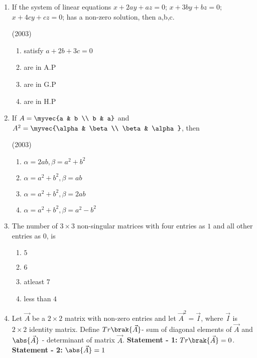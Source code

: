 	\begin{enumerate}
\item
	If the system of linear equations $x+2ay+az = 0$; $x+3by+bz = 0$; $x+4cy+cz = 0$; has a non-zero solution, then a,b,c.

	\hfill (2003)

	\begin{enumerate}
                \item satisfy $a+ 2b+3c = 0$
                \item are in A.P
                \item are in G.P
                \item are in H.P
        \end{enumerate} 	


\item
        If $A=\myvec{a & b \\ b & a}$ and $A^{2}=\myvec{\alpha & \beta \\ \beta & \alpha}$, then 
        
	\hfill (2003)
                                             
        \begin{enumerate}
		\item $\alpha=2ab, \beta=a^{2}+b^{2}$
                \item $\alpha=a^{2}+b^{2}, \beta=ab$
                \item $\alpha=a^{2}+b^{2}, \beta=2ab$
                \item $\alpha=a^{2}+b^{2}, \beta=a^{2}-b^{2}$
        \end{enumerate}

\newcommand{\adj}[1]{$adj\brak{#1}$}
%
    \item The number of $3\times3$ non-singular matrices with four entries as $1$ and all other entries as $0$, is 
	\hfill{}{\par}


	\begin{enumerate}
                \item $5$ 
		\item $6$
		\item atleast $7$
		\item less than $4$ 
	\end{enumerate}
    \item Let $\vec{A}$ be a $2\times2$ matrix with non-zero entries and let $\vec{A}^2 = \vec{I}$, where $\vec{I}$ is $2\times2$ identity matrix. Define 
	\newline
	$Tr\brak{\vec{A}}$- sum of diagonal elements of $\vec{A}$ and
	\newline
	$\abs{\vec{A}}$ - determinant of matrix $\vec{A}$.
	\newline
	\textbf{Statement - 1:} $Tr\brak{\vec{A}} = 0$.
	\newline
	\textbf{Statement - 2:} $\abs{\vec{A}} = 1$


\end{enumerate}
